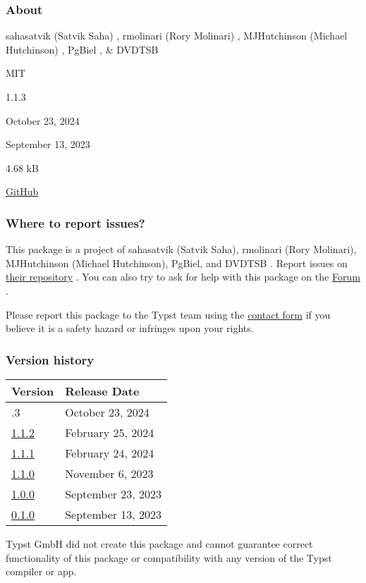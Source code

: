\subsubsection{About}\label{about}

\begin{description}
\tightlist
\item[Author s :]
sahasatvik (Satvik Saha) , rmolinari (Rory Molinari) , MJHutchinson
(Michael Hutchinson) , PgBiel , \& DVDTSB
\item[License:]
MIT
\item[Current version:]
1.1.3
\item[Last updated:]
October 23, 2024
\item[First released:]
September 13, 2023
\item[Archive size:]
4.68 kB
\href{https://packages.typst.org/preview/ctheorems-1.1.3.tar.gz}{\pandocbounded{}}
\item[Repository:]
\href{https://github.com/sahasatvik/typst-theorems}{GitHub}
\end{description}

\subsubsection{Where to report issues?}\label{where-to-report-issues}

This package is a project of sahasatvik (Satvik Saha), rmolinari (Rory
Molinari), MJHutchinson (Michael Hutchinson), PgBiel, and DVDTSB .
Report issues on
\href{https://github.com/sahasatvik/typst-theorems}{their repository} .
You can also try to ask for help with this package on the
\href{https://forum.typst.app}{Forum} .

Please report this package to the Typst team using the
\href{https://typst.app/contact}{contact form} if you believe it is a
safety hazard or infringes upon your rights.

\label{versions}
\subsubsection{Version history}\label{version-history}

\begin{longtable}[]{@{}ll@{}}
\toprule\noalign{}
Version & Release Date \\
\midrule\noalign{}
\endhead
\bottomrule\noalign{}
\endlastfoot
1.1.3 & October 23, 2024 \\
\href{https://typst.app/universe/package/ctheorems/1.1.2/}{1.1.2} &
February 25, 2024 \\
\href{https://typst.app/universe/package/ctheorems/1.1.1/}{1.1.1} &
February 24, 2024 \\
\href{https://typst.app/universe/package/ctheorems/1.1.0/}{1.1.0} &
November 6, 2023 \\
\href{https://typst.app/universe/package/ctheorems/1.0.0/}{1.0.0} &
September 23, 2023 \\
\href{https://typst.app/universe/package/ctheorems/0.1.0/}{0.1.0} &
September 13, 2023 \\
\end{longtable}

Typst GmbH did not create this package and cannot guarantee correct
functionality of this package or compatibility with any version of the
Typst compiler or app.
